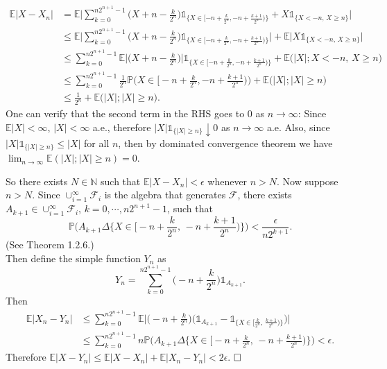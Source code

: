 \documentclass[12pt]{extarticle}
\begin{document}
\begin{equation*}
\begin{aligned}
\mathbb{E}|X-X_n| &= \mathbb{E}\Big|\sum_{k=0}^{n2^{n+1}-1}\Big(X+n-\frac{k}{2^n}\Big)\mathds{1}_{\{X\in[-n+\frac{k}{2^n},-n+\frac{k+1}{2^n})\}}+X\mathds{1}_{\{X<-n,\,X\geq n\}}\Big| \\&
\leq \mathbb{E}\Big|\sum_{k=0}^{n2^{n+1}-1}\Big(X+n-\frac{k}{2^n}\Big)\mathds{1}_{\{X\in[-n+\frac{k}{2^n},-n+\frac{k+1}{2^n})\}}\Big|
+\mathbb{E}\Big|X\mathds{1}_{\{X<-n,\,X\geq n\}}\Big| \\&
\leq \sum_{k=0}^{n2^{n+1}-1}\mathbb{E}\Big|\Big(X+n-\frac{k}{2^n}\Big)\Big|\mathds{1}_{\{X\in[-n+\frac{k}{2^n},-n+\frac{k+1}{2^n})\}}
+\mathbb{E}\big(|X|;X<- n,\,X\geq n\big) \\&
\leq \sum_{k=0}^{n2^{n+1}-1}\frac{1}{2^n}\mathbb{P}\Big(X\in\Big[-n+\frac{k}{2^n},-n+\frac{k+1}{2^n}\Big)\Big)+\mathbb{E}\big(|X|;|X|\geq n\big) \\&
\leq\frac{1}{2^n}+\mathbb{E}\big(|X|;|X|\geq n\big).
\end{aligned}
\end{equation*}
One can verify that the second term in the RHS goes to $0$ as $n\rightarrow\infty$: Since $\mathbb{E}|X|<\infty$, $|X|<\infty$ a.e., therefore $|X|\mathds{1}_{\{|X|\geq n\}}\downarrow 0$ as $n\rightarrow\infty$ a.e. Also, since $|X|\mathds{1}_{\{|X|\geq n\}}\leq |X|$ for all $n$, then by dominated convergence theorem we have $\lim_{n\rightarrow\infty}\mathbb{E}(|X|;|X|\geq n)=0$.

So there exists $N\in\mathbb{N}$ such that $\mathbb{E}|X-X_n|<\epsilon$ whenever $n>N$. Now suppose $n>N$. Since $\cup_{i=1}^\infty\mathcal{F}_i$ is the algebra that generates $\mathcal{F}$, there exists $A_{k+1}\in\cup_{i=1}^\infty\mathcal{F}_i$, $k=0,\cdots,n2^{n+1}-1$, such that
\begin{equation*}
\mathbb{P}\Big(A_{k+1}\Delta\Big\{X\in\Big[-n+\frac{k}{2^n},\,-n+\frac{k+1}{2^n}\Big)\Big\}\Big)<\frac{\epsilon}{n2^{k+1}}.
\end{equation*}
(See Theorem 1.2.6.)\\
Then define the simple function $Y_n$ as
\begin{equation*}
Y_n=\sum_{k=0}^{n2^{n+1}-1}\Big(-n+\frac{k}{2^n}\Big)\mathds{1}_{A_{k+1}}.
\end{equation*}
Then
\begin{equation*}
\begin{aligned}
\mathbb{E}|X_n-Y_n| &\leq\sum_{k=0}^{n2^{n+1}-1}\mathbb{E}\Big|\Big(-n+\frac{k}{2^n}\Big)\big(\mathds{1}_{A_{k+1}}-\mathds{1}_{\{X\in[\frac{k}{2^n},\,\frac{k+1}{2^n})\}}\big)\Big| \\&
\leq\sum_{k=0}^{n2^{n+1}-1}n\mathbb{P}\Big(A_{k+1}\Delta\Big\{X\in\Big[-n+\frac{k}{2^n},\,-n+\frac{k+1}{2^n}\Big)\Big\}\Big)<\epsilon.
\end{aligned}
\end{equation*}
Therefore $\mathbb{E}|X-Y_n|\leq\mathbb{E}|X-X_n|+\mathbb{E}|X_n-Y_n|<2\epsilon$.
$\hspace{\fill}\square$
\end{document}
